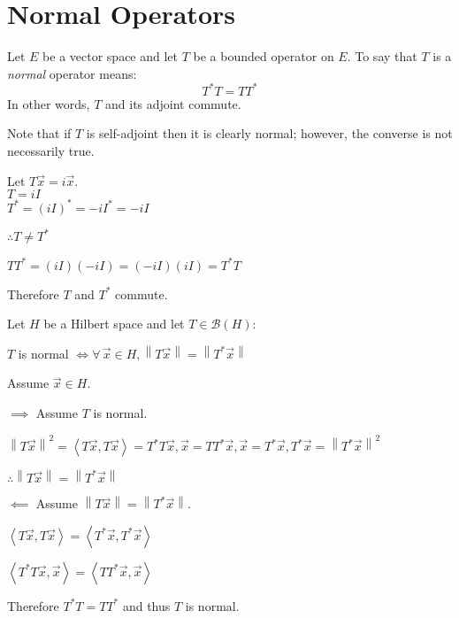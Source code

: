\documentclass[letterpaper,12pt,fleqn]{article}
\newcommand{\vx}{\vec{x}}
\newcommand{\mb}{\mathcal{B}}
\newcommand{\norm}[1]{\left\|#1\right\|}
\newcommand{\inner}[1]{\left<#1\right>}
\begin{document}
\section*{Normal Operators}

\begin{definition}[Normal]
  Let $E$ be a vector space and let $T$ be a bounded operator on $E$. To say
  that $T$ is a \emph{normal} operator means:
  \[T^*T=TT^*\]
  In other words, $T$ and its adjoint commute.
\end{definition}

Note that if $T$ is self-adjoint then it is clearly normal; however, the
converse is not necessarily true.

\begin{example}
  Let $T\vx=i\vx$. \\
  $T=iI$ \\
  $T^*=(iI)^*=-iI^*=-iI$

  $\therefore T\ne T^*$

  $TT^*=(iI)(-iI)=(-iI)(iI)=T^*T$

  Therefore $T$ and $T^*$ commute.
\end{example}

\begin{theorem}
  Let $H$ be a Hilbert space and let $T\in\mb(H)$:

  \qquad$T$ is normal $\iff\forall\,\vx\in H,\norm{T\vx}=\norm{T^*\vx}$
\end{theorem}

\begin{theproof}
  Assume $\vx\in H$.
  \begin{description}
  \item $\implies$ Assume $T$ is normal.

    $\norm{T\vx}^2=\inner{T\vx,T\vx}={T^*T\vx,\vx}={TT^*\vx,\vx}=
    {T^*\vx,T^*\vx}=\norm{T^*\vx}^2$

    $\therefore\norm{T\vx}=\norm{T^*\vx}$

  \item $\impliedby$ Assume $\norm{T\vx}=\norm{T^*\vx}$.

    $\inner{T\vx,T\vx}=\inner{T^*\vx,T^*\vx}$

    $\inner{T^*T\vx,\vx}=\inner{TT^*\vx,\vx}$

    Therefore $T^*T=TT^*$ and thus $T$ is normal.
  \end{description}
\end{theproof}

\newpage
\end{document}
